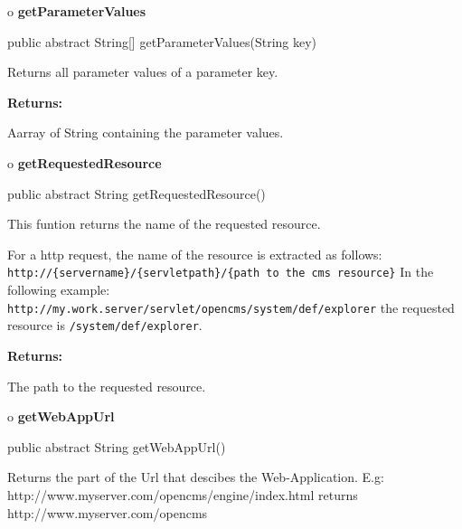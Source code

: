 o {\bf getParameterValues} 

\begin{PRE}
 public abstract String[] getParameterValues(String key)
\end{PRE}

\begin{description}
\htmlDD Returns all parameter values of a parameter key. 

\begin{description}
\item {\bf Returns:}  

Aarray of String containing the parameter values.  
\end{description}

\end{description}

o {\bf getRequestedResource} 

\begin{PRE}
 public abstract String getRequestedResource()
\end{PRE}

\begin{description}
\htmlDD This funtion returns the name of the requested resource. 

For a http request, the name of the resource is extracted as follows: {\tt
http://\{servername\}/\{servletpath\}/\{path to the cms resource\}} In the
following example: {\tt
http://my.work.server/servlet/opencms/system/def/explorer} the requested
resource is {\tt /system/def/explorer}. 

\begin{description}
\item {\bf Returns:}  

The path to the requested resource.  
\end{description}

\end{description}

o {\bf getWebAppUrl} 

\begin{PRE}
 public abstract String getWebAppUrl()
\end{PRE}

\begin{description}
\htmlDD Returns the part of the Url that descibes the Web-Application. E.g:
http://www.myserver.com/opencms/engine/index.html returns
http://www.myserver.com/opencms 

\end{description}

